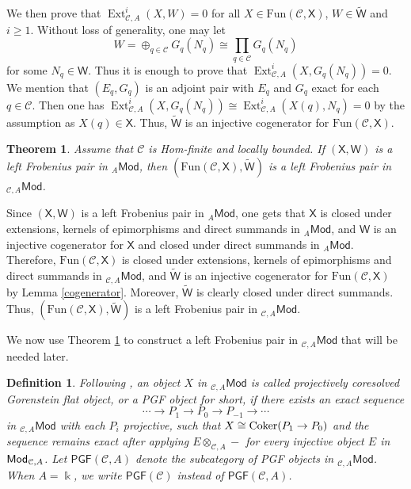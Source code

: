 \documentclass{amsart}
\theoremstyle{bfupright head,slanted body}
\theoremstyle{bfupright head,upright body}
\theoremstyle{fixed bf head,slanted body}
\newtheorem{thm}[res]{Theorem}          \newtheorem*{thm*}{Theorem}
\theoremstyle{fixed bf head,upright body}
\newtheorem{dfn}[res]{Definition}       \newtheorem*{dfn*}{Definition}
\theoremstyle{numbered paragraph}
\newenvironment{prf*}[1][Proof]{%
	\begin{proof}[\bf #1]
		\setcounter{equation}{0}
		\renewcommand{\theequation}{\arabic{equation}}}
	{\end{proof}
}
\numberwithin{equation}{res}
\newcommand{\PGF}[1]{\mathsf{PGF}(#1)}
\newcommand{\Mod}[1]{{_{#1}\mathsf{Mod}}}
\newcommand{\Ext}[4][]{\operatorname{Ext}_{#1}^{#2}(#3,#4)}
\newcommand{\Coker}[1]{\nobreak{\operatorname{Coker}#1}}
\newcommand{\Fun}{\mathrm{Fun}}
\newcommand{\X}{\mathsf{X}}
\newcommand{\W}{\mathsf{W}}
\newcommand{\C}{\mathcal{C}}
\newcommand{\kk}{\Bbbk}
\newcommand{\is}{\cong}
\newcommand{\rMod}[1]{{\sf{Mod}}_{#1}}
\begin{document}
\begin{prf*}
We then prove that $\Ext[\C,A]{i}{X}{W}=0$ for all $X\in\Fun(\C,\X)$, $W\in\widetilde{\W}$ and $i\geqslant1$. Without loss of generality, one may let
$$W=\oplus_{q\in\C} G_q(N_q)\is\prod_{q\in\C} G_q(N_q)$$
for some $N_q\in\W$. Thus it is enough to prove that $\Ext[\C,A]{i}{X}{G_q(N_q)}=0$. We mention that $(E_q, G_q)$ is an adjoint pair with $E_q$ and $G_q$ exact for each $q\in\C$. Then one has $\Ext[\C,A]{i}{X}{G_q(N_q)}\is\Ext[\C,A]{i}{X(q)}{N_q}=0$ by the assumption as $X(q)\in\X$. Thus, $\widetilde{\W}$ is an injective cogenerator for $\Fun(\C,\X)$.
\end{prf*}

\begin{thm}\label{Fpair}
Assume that $\C$ is Hom-finite and locally bounded. If $(\X, \W)$ is a left Frobenius pair in $\Mod{A}$, then $(\Fun(\C,\X), \widetilde{\W})$ is a left Frobenius pair in $\Mod{\C,A}$.
\end{thm}

\begin{prf*}
Since $(\X, \W)$ is a left Frobenius pair in $\Mod{A}$, one gets that $\X$ is closed under extensions, kernels of epimorphisms
and direct summands in $\Mod{A}$, and $\W$ is an injective cogenerator for $\X$ and closed under direct summands in $\Mod{A}$. Therefore, $\Fun(\C,\X)$ is closed under extensions, kernels of epimorphisms and direct summands in $\Mod{\C,A}$, and $\widetilde{\W}$ is an injective cogenerator for $\Fun(\C,\X)$ by Lemma \ref{cogenerator}. Moreover, ${\widetilde{\W}}$ is clearly closed under direct summands. Thus, $(\Fun(\C,\X), \widetilde{\W})$ is a left Frobenius pair in $\Mod{\C,A}$.
\end{prf*}

We now use Theorem \ref{Fpair} to construct a left Frobenius pair in $\Mod{\C,A}$ that will be needed later.

\begin{dfn}
Following \cite{SS20}, an object $X$ in $\Mod{\C, A}$ is called \emph{projectively coresolved Gorenstein flat object}, or a \emph{PGF object} for short, if there exists an exact sequence
\[\cdots \to P_{1}\to P_{0}\to P_{-1}\to\cdots\]
in $\Mod{\C, A}$ with each $P_{i}$ projective, such that $X\cong\Coker{(P_{1}\to P_{0})}$ and the sequence remains exact after applying $E\otimes_{\C,A}-$ for every injective object $E$ in $\rMod{\C,A}$. Let $\PGF{\C,A}$ denote the subcategory of PGF objects in $\Mod{\C,A}$. When $A=\kk$, we write $\PGF{\C}$ instead of $\PGF{\C,A}$.
\end{dfn}
\end{document}
